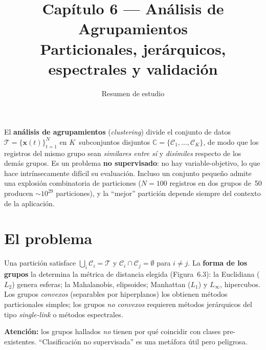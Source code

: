 

\title{\sffamily\bfseries Capítulo 6 — Análisis de Agrupamientos\\
       \large Particionales, jerárquicos, espectrales y validación}
\author{Resumen de estudio}
\date{}


\maketitle
\thispagestyle{fancy}

\begin{conceito}
El \textbf{análisis de agrupamientos} (\emph{clustering}) divide el
conjunto de datos $\mathcal{T}=\{\mathbf{x}(t)\}_{t=1}^{N}$ en
$K$~subconjuntos disjuntos
$\mathbb{C}=\{\mathcal{C}_1,\dots,\mathcal{C}_K\}$, de modo que los
registros del mismo grupo sean \emph{similares entre sí} y
\emph{disímiles} respecto de los demás grupos. Es un problema
\textbf{no supervisado}: no hay variable-objetivo, lo que hace
intrínsecamente difícil su evaluación. Incluso un conjunto pequeño
admite una explosión combinatoria de particiones ($N=100$ registros en
dos grupos de~50 producen $\sim 10^{29}$ particiones), y la ``mejor''
partición depende siempre del contexto de la aplicación.
\end{conceito}

\section{El problema}

Una partición satisface
$\bigcup_{i}\mathcal{C}_i=\mathcal{T}$ y
$\mathcal{C}_i\cap\mathcal{C}_j=\emptyset$ para $i\neq j$. La
\textbf{forma de los grupos} la determina la métrica de distancia
elegida (Figura~6.3): la Euclidiana ($L_2$) genera esferas; la
Mahalanobis, elipsoides; Manhattan ($L_1$) y $L_\infty$, hipercubos.
Los grupos \emph{convexos} (separables por hiperplanos) los obtienen
métodos particionales simples; los grupos \emph{no convexos} requieren
métodos jerárquicos del tipo \emph{single-link} o métodos espectrales.

\textbf{Atención:} los grupos hallados \emph{no} tienen por qué
coincidir con clases pre-existentes. ``Clasificación no supervisada''
es una metáfora útil pero peligrosa.

